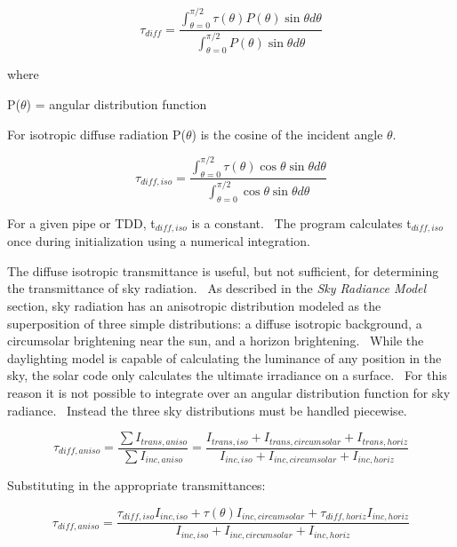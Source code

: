 \begin{equation}
{\tau_{diff}} = \frac{{\int_{\theta  = 0}^{\pi /2} {\tau (\theta )P(\theta )} \sin \theta d\theta }}{{\int_{\theta  = 0}^{\pi /2} {P(\theta )} \sin \theta d\theta }}
\end{equation}

where

P(\(\theta\)) = angular distribution function

For isotropic diffuse radiation P(\(\theta\)) is the cosine of the incident angle \(\theta\).

\begin{equation}
{\tau_{diff,iso}} = \frac{{\int_{\theta  = 0}^{\pi /2} {\tau (\theta )\cos \theta } \sin \theta d\theta }}{{\int_{\theta  = 0}^{\pi /2} {\cos \theta } \sin \theta d\theta }}
\end{equation}

For a given pipe or TDD, t\(_{diff,iso}\) is a constant.~ The program calculates t\(_{diff,iso}\) once during initialization using a numerical integration.

The diffuse isotropic transmittance is useful, but not sufficient, for determining the transmittance of sky radiation.~ As described in the \emph{Sky Radiance Model} section, sky radiation has an anisotropic distribution modeled as the superposition of three simple distributions: a diffuse isotropic background, a circumsolar brightening near the sun, and a horizon brightening.~ While the daylighting model is capable of calculating the luminance of any position in the sky, the solar code only calculates the ultimate irradiance on a surface.~ For this reason it is not possible to integrate over an angular distribution function for sky radiance.~ Instead the three sky distributions must be handled piecewise.

\begin{equation}
{\tau_{diff,aniso}} = \frac{{\sum {{I_{trans,aniso}}} }}{{\sum {{I_{inc,aniso}}} }} = \frac{{{I_{trans,iso}} + {I_{trans,circumsolar}} + {I_{trans,horiz}}}}{{{I_{inc,iso}} + {I_{inc,circumsolar}} + {I_{inc,horiz}}}}
\end{equation}

Substituting in the appropriate transmittances:

\begin{equation}
{\tau_{diff,aniso}} = \frac{{{\tau_{diff,iso}}{I_{inc,iso}} + \tau (\theta ){I_{inc,circumsolar}} + {\tau_{diff,horiz}}{I_{inc,horiz}}}}{{{I_{inc,iso}} + {I_{inc,circumsolar}} + {I_{inc,horiz}}}}
\end{equation}

